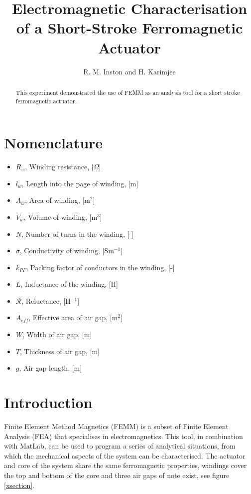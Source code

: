 \documentclass[a4paper]{IEEEtran}
\begin{document}
\title{Electromagnetic Characterisation of a Short-Stroke Ferromagnetic Actuator}
\author{R. M. Inston and H. Karimjee}

\maketitle
\begin{abstract}
This experiment demonstrated the use of FEMM as an analysis tool for a short stroke ferromagnetic actuator. 
\end{abstract}

\section{Nomenclature}
\begin{itemize}
\item[]{$R_{w}$, Winding resistance, [$\Omega$]}
\item[]{$l_{w}$, Length into the page of winding, [m]}
\item[]{$A_{w}$, Area of winding, [m$^{2}$]}
\item[]{$V_{w}$, Volume of winding, [m$^{3}$]}
\item[]{$N$, Number of turns in the winding, [-]}
\item[]{$\sigma$, Conductivity of winding, [Sm$^{-1}$]}
\item[]{$k_{PF}$, Packing factor of conductors in the winding, [-]}
\item[]{$L$, Inductance of the winding, [H]}
\item[]{$\mathcal{R}$, Reluctance, [H$^{-1}$]}
\item[]{$A_{eff}$, Effective area of air gap, [m$^{2}$]}
\item[]{$W$, Width of air gap, [m]}
\item[]{$T$, Thickness of air gap, [m]}
\item[]{$g$, Air gap length, [m]}
\end{itemize}

\section{Introduction}

Finite Element Method Magnetics (FEMM) is a subset of Finite Element Analysis (FEA) that specialises in electromagnetics. This tool, in combination with MatLab, can be used to program a series of analytical situations, from which the mechanical aspects of the system can be characterised. The actuator and core of the system share the same ferromagnetic properties, windings cover the top and bottom of the core and three air gaps of note exist, see figure \ref{xsection}.
\end{document}
